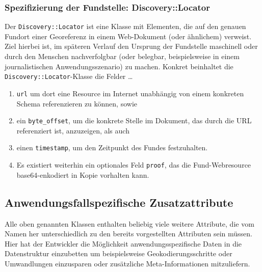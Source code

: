 \subsubsection{Spezifizierung der Fundstelle: Discovery::Locator}
Der \texttt{Discovery::Locator} ist eine Klasse mit Elementen, die auf den genauen Fundort einer Georeferenz in einem Web-Dokument (oder ähnlichem) verweist. Ziel hierbei ist, im späteren Verlauf den Ursprung der Fundstelle maschinell oder durch den Menschen nachverfolgbar (oder belegbar, beispielsweise in einem journalistischen Anwendungsszenario) zu machen. Konkret beinhaltet die \texttt{Discovery::Locator}-Klasse die Felder \ldots

\begin{enumerate}
  \item{\texttt{url} um dort eine Resource im Internet unabhängig von einem konkreten Schema referenzieren zu können, sowie}
  \item{ein \texttt{byte\_offset}, um die konkrete Stelle im Dokument, das durch die URL referenziert ist, anzuzeigen, als auch}
  \item{einen \texttt{timestamp}, um den Zeitpunkt des Fundes festzuhalten.}
  \item{Es existiert weiterhin ein optionales Feld \texttt{proof}, das die Fund-Webresource base64-enkodiert in Kopie vorhalten kann.}
\end{enumerate}
  

\subsection{Anwendungsfallspezifische Zusatzattribute}

Alle oben genannten Klassen enthalten beliebig viele weitere Attribute, die vom Namen her unterschiedlich zu den bereits vorgestellten Attributen sein müssen. Hier hat der Entwickler die Möglichkeit anwendungsspezifische Daten in die Datenstruktur einzubetten um beispielsweise Geokodierungsschritte oder Umwandlungen einzusparen oder zusätzliche Meta-Informationen mitzuliefern.

